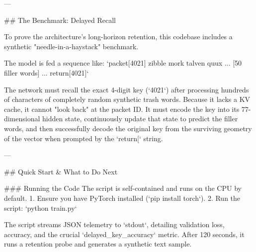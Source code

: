 ---

## The Benchmark: Delayed Recall

To prove the architecture's long-horizon retention, this codebase includes a synthetic "needle-in-a-haystack" benchmark.

The model is fed a sequence like:
`packet[4021] zibble mork talven quux ... [50 filler words] ... return[4021]`

The network must recall the exact 4-digit key (`4021`) after processing hundreds of characters of completely random synthetic trash words. Because it lacks a KV cache, it cannot "look back" at the packet ID. It must encode the key into its 77-dimensional hidden state, continuously update that state to predict the filler words, and then successfully decode the original key from the surviving geometry of the vector when prompted by the `return[` string.

---

## Quick Start & What to Do Next

### Running the Code
The script is self-contained and runs on the CPU by default. 
1. Ensure you have PyTorch installed (`pip install torch`).
2. Run the script: `python train.py`

The script streams JSON telemetry to `stdout`, detailing validation loss, accuracy, and the crucial `delayed_key_accuracy` metric. After 120 seconds, it runs a retention probe and generates a synthetic text sample.
